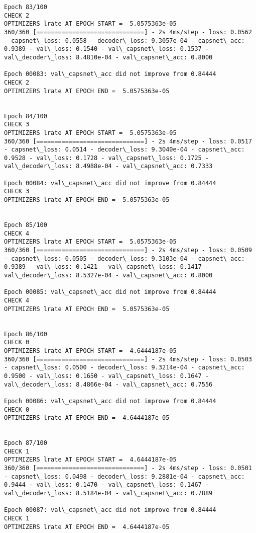 \documentclass[11pt]{article}
\begin{document}
\begin{Verbatim}[commandchars=\\\{\}]
Epoch 83/100
CHECK 2
OPTIMIZERS lrate AT EPOCH START =  5.0575363e-05
360/360 [==============================] - 2s 4ms/step - loss: 0.0562 - capsnet\_loss: 0.0558 - decoder\_loss: 9.3057e-04 - capsnet\_acc: 0.9389 - val\_loss: 0.1540 - val\_capsnet\_loss: 0.1537 - val\_decoder\_loss: 8.4810e-04 - val\_capsnet\_acc: 0.8000

Epoch 00083: val\_capsnet\_acc did not improve from 0.84444
CHECK 2
OPTIMIZERS lrate AT EPOCH END =  5.0575363e-05 


Epoch 84/100
CHECK 3
OPTIMIZERS lrate AT EPOCH START =  5.0575363e-05
360/360 [==============================] - 2s 4ms/step - loss: 0.0517 - capsnet\_loss: 0.0514 - decoder\_loss: 9.3040e-04 - capsnet\_acc: 0.9528 - val\_loss: 0.1728 - val\_capsnet\_loss: 0.1725 - val\_decoder\_loss: 8.4988e-04 - val\_capsnet\_acc: 0.7333

Epoch 00084: val\_capsnet\_acc did not improve from 0.84444
CHECK 3
OPTIMIZERS lrate AT EPOCH END =  5.0575363e-05 


Epoch 85/100
CHECK 4
OPTIMIZERS lrate AT EPOCH START =  5.0575363e-05
360/360 [==============================] - 2s 4ms/step - loss: 0.0509 - capsnet\_loss: 0.0505 - decoder\_loss: 9.3103e-04 - capsnet\_acc: 0.9389 - val\_loss: 0.1421 - val\_capsnet\_loss: 0.1417 - val\_decoder\_loss: 8.5327e-04 - val\_capsnet\_acc: 0.8000

Epoch 00085: val\_capsnet\_acc did not improve from 0.84444
CHECK 4
OPTIMIZERS lrate AT EPOCH END =  5.0575363e-05 


Epoch 86/100
CHECK 0
OPTIMIZERS lrate AT EPOCH START =  4.6444187e-05
360/360 [==============================] - 2s 4ms/step - loss: 0.0503 - capsnet\_loss: 0.0500 - decoder\_loss: 9.3214e-04 - capsnet\_acc: 0.9500 - val\_loss: 0.1650 - val\_capsnet\_loss: 0.1647 - val\_decoder\_loss: 8.4866e-04 - val\_capsnet\_acc: 0.7556

Epoch 00086: val\_capsnet\_acc did not improve from 0.84444
CHECK 0
OPTIMIZERS lrate AT EPOCH END =  4.6444187e-05 


Epoch 87/100
CHECK 1
OPTIMIZERS lrate AT EPOCH START =  4.6444187e-05
360/360 [==============================] - 2s 4ms/step - loss: 0.0501 - capsnet\_loss: 0.0498 - decoder\_loss: 9.2881e-04 - capsnet\_acc: 0.9444 - val\_loss: 0.1470 - val\_capsnet\_loss: 0.1467 - val\_decoder\_loss: 8.5184e-04 - val\_capsnet\_acc: 0.7889

Epoch 00087: val\_capsnet\_acc did not improve from 0.84444
CHECK 1
OPTIMIZERS lrate AT EPOCH END =  4.6444187e-05 



\end{Verbatim}
\end{document}
